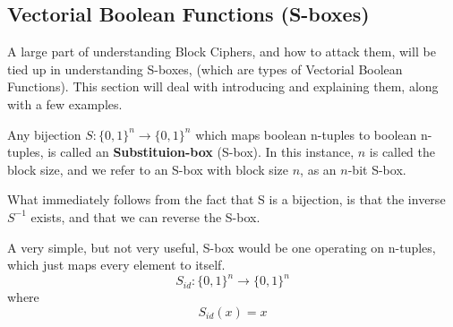 \subsection{Vectorial Boolean Functions (S-boxes)}
A large part of understanding Block Ciphers, and how to attack them, will be
tied up in understanding S-boxes, (which are types of Vectorial Boolean
Functions). This section will deal with introducing and explaining them, along
with a few examples.

\begin{defn}
Any bijection $S:\{0,1\}^n \rightarrow \{0,1\}^n$ which maps boolean n-tuples
to boolean n-tuples, is called an \textbf{Substituion-box} (S-box). In this
instance, $n$ is called the block size, and we refer to an S-box with block
size $n$, as an $n$-bit S-box.
\end{defn}

What immediately follows from the fact that S is a bijection, is that
the inverse $S^{-1}$ exists, and that we can reverse the S-box.

\begin{example}
A very simple, but not very useful, S-box would be one operating on n-tuples, which just maps
every element to itself.
\begin{equation}
S_{id}: \{0,1\}^n \rightarrow \{0,1\}^n
\end{equation}
where
\begin{equation}
S_{id}(x) = x
\end{equation}

\end{example}

